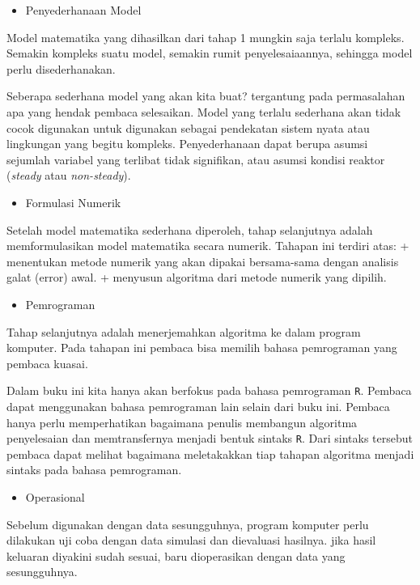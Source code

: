 \documentclass[]{book}
\providecommand{\tightlist}{%
  \setlength{\itemsep}{0pt}\setlength{\parskip}{0pt}}
\theoremstyle{definition}
\theoremstyle{definition}
\theoremstyle{definition}
\theoremstyle{remark}
\begin{document}
\begin{itemize}
\tightlist
\item
  Penyederhanaan Model
\end{itemize}

Model matematika yang dihasilkan dari tahap 1 mungkin saja terlalu kompleks. Semakin kompleks suatu model, semakin rumit penyelesaiaannya, sehingga model perlu disederhanakan.

Seberapa sederhana model yang akan kita buat? tergantung pada permasalahan apa yang hendak pembaca selesaikan. Model yang terlalu sederhana akan tidak cocok digunakan untuk digunakan sebagai pendekatan sistem nyata atau lingkungan yang begitu kompleks. Penyederhanaan dapat berupa asumsi sejumlah variabel yang terlibat tidak signifikan, atau asumsi kondisi reaktor (\emph{steady} atau \emph{non-steady}).

\begin{itemize}
\tightlist
\item
  Formulasi Numerik
\end{itemize}

Setelah model matematika sederhana diperoleh, tahap selanjutnya adalah memformulasikan model matematika secara numerik. Tahapan ini terdiri atas:
+ menentukan metode numerik yang akan dipakai bersama-sama dengan analisis galat (error) awal.
+ menyusun algoritma dari metode numerik yang dipilih.

\begin{itemize}
\tightlist
\item
  Pemrograman
\end{itemize}

Tahap selanjutnya adalah menerjemahkan algoritma ke dalam program komputer. Pada tahapan ini pembaca bisa memilih bahasa pemrograman yang pembaca kuasai.

Dalam buku ini kita hanya akan berfokus pada bahasa pemrograman \texttt{R}. Pembaca dapat menggunakan bahasa pemrograman lain selain dari buku ini. Pembaca hanya perlu memperhatikan bagaimana penulis membangun algoritma penyelesaian dan memtransfernya menjadi bentuk sintaks \texttt{R}. Dari sintaks tersebut pembaca dapat melihat bagaimana meletakakkan tiap tahapan algoritma menjadi sintaks pada bahasa pemrograman.

\begin{itemize}
\tightlist
\item
  Operasional
\end{itemize}

Sebelum digunakan dengan data sesungguhnya, program komputer perlu dilakukan uji coba dengan data simulasi dan dievaluasi hasilnya. jika hasil keluaran diyakini sudah sesuai, baru dioperasikan dengan data yang sesungguhnya.
\end{document}
